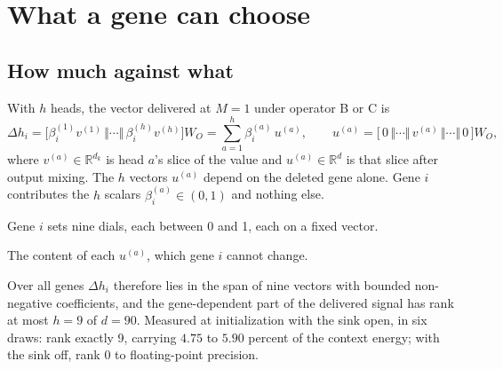 
\section{What a gene can choose}
\label{sec:capacity}

\subsection{How much against what}

With $h$ heads, the vector delivered at $M=1$ under operator B or C is
\begin{equation}
\Delta h_i=\Big[\beta^{(1)}_{i}v^{(1)}\,\Vert\cdots\Vert\,\beta^{(h)}_{i}v^{(h)}\Big]W_O
=\sum_{a=1}^{h}\beta^{(a)}_{i}\,u^{(a)},\qquad
u^{(a)}=\big[\,0\,\Vert\cdots\Vert\,v^{(a)}\,\Vert\cdots\Vert\,0\,\big]W_O ,
\label{eq:dials}
\end{equation}
where $v^{(a)}\in\mathbb{R}^{d_k}$ is head $a$'s slice of the value and
$u^{(a)}\in\mathbb{R}^{d}$ is that slice after output mixing. The $h$ vectors $u^{(a)}$
depend on the deleted gene alone. Gene $i$ contributes the $h$ scalars
$\beta^{(a)}_i\in(0,1)$ and nothing else.

 Gene $i$ sets nine dials, each between 0 and 1, each on a fixed vector.

 The content of each $u^{(a)}$, which gene $i$ cannot change.

Over all genes $\Delta h_i$ therefore lies in the span of nine vectors with bounded
non-negative coefficients, and the gene-dependent part of the delivered signal has rank at
most $h=9$ of $d=90$. Measured at initialization with the sink open, in six draws: rank
exactly 9, carrying $4.75$ to $5.90$ percent of the context energy; with the sink off,
rank 0 to floating-point precision.

